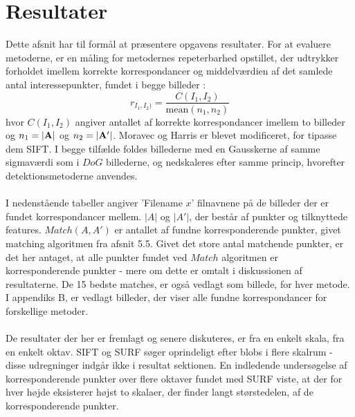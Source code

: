\chapter{Resultater}
\label{sec:resultater}
Dette afsnit har til formål at præsentere opgavens resultater. For at evaluere metoderne, er en måling for metodernes repeterbarhed opstillet, der udtrykker forholdet imellem korrekte korrespondancer og middelværdien af det samlede antal interessepunkter, fundet i begge billeder \cite{eval}:
\begin{equation}
r_{I_1,I_2)}=\dfrac{C(I_1,I_2)}{\text{mean}(n_1,n_2)}
\end{equation}
hvor $C(I_1,I_2)$ angiver antallet af korrekte korrespondancer imellem to billeder og $n_1=\bold{|A|}$ og $n_2=\bold{|A'|}$.
Moravec og Harris er blevet modificeret, for tipasse dem SIFT. I begge tilfælde foldes billederne med en Gausskerne af samme sigmaværdi som i $DoG$ billederne, og nedskaleres efter samme princip, hvorefter detektionsmetoderne anvendes. 
\\
\\
I nedenstående tabeller angiver 'Filename $x$' filnavnene på de billeder der er fundet korrespondancer mellem. $|A|$ og $|A'|$, der består af punkter og tilknyttede features. $Match(A, A')$ er antallet af fundne korresponderende punkter, givet matching algoritmen fra afsnit 5.5. Givet det store antal matchende punkter, er det her antaget, at alle punkter fundet ved $Match$ algoritmen er korresponderende punkter - mere om dette er omtalt i diskussionen af resultaterne. De 15 bedste matches, er også vedlagt som billede, for hver metode. I appendiks B, er vedlagt billeder, der viser alle fundne korrespondancer for forskellige metoder.
\\
\\
De resultater der her er fremlagt og senere diskuteres, er fra en enkelt skala, fra en enkelt oktav. SIFT og SURF søger oprindeligt efter blobs i flere skalrum - disse udregninger indgår ikke i resultat sektionen. En indledende undersøgelse af korresponderende punkter over flere oktaver fundet med SURF viste, at der for hver højde eksisterer højst to skalaer, der finder langt størstedelen, af de korresponderende punkter.
